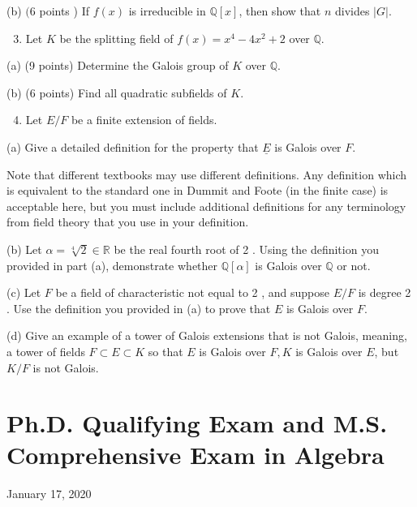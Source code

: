 \documentclass[10pt]{article}
\begin{document}
(b) $(6$ points ) If $f(x)$ is irreducible in $\mathbb{Q}[x]$, then show that $n$ divides $|G|$.

\begin{enumerate}
  \setcounter{enumi}{2}
  \item Let $K$ be the splitting field of $f(x)=x^{4}-4 x^{2}+2$ over $\mathbb{Q}$.
\end{enumerate}
(a) (9 points) Determine the Galois group of $K$ over $\mathbb{Q}$.

(b) (6 points) Find all quadratic subfields of $K$.

\begin{enumerate}
  \setcounter{enumi}{3}
  \item Let $E / F$ be a finite extension of fields.
\end{enumerate}
(a) Give a detailed definition for the property that $\underline{E}$ is Galois over $F$.

Note that different textbooks may use different definitions. Any definition which is equivalent to the standard one in Dummit and Foote (in the finite case) is acceptable here, but you must include additional definitions for any terminology from field theory that you use in your definition.

(b) Let $\alpha=\sqrt[4]{2} \in \mathbb{R}$ be the real fourth root of 2 . Using the definition you provided in part (a), demonstrate whether $\mathbb{Q}[\alpha]$ is Galois over $\mathbb{Q}$ or not.

(c) Let $F$ be a field of characteristic not equal to 2 , and suppose $E / F$ is degree 2 . Use the definition you provided in (a) to prove that $E$ is Galois over $F$.

(d) Give an example of a tower of Galois extensions that is not Galois, meaning, a tower of fields $F \subset E \subset K$ so that $E$ is Galois over $F, K$ is Galois over $E$, but $K / F$ is not Galois.

\section*{Ph.D. Qualifying Exam and M.S. Comprehensive Exam in Algebra }

January 17, 2020
\end{document}
